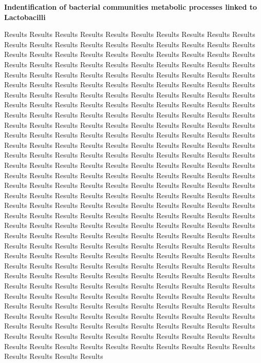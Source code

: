 \documentclass[
]{article}
\begin{document}
\clearpage

\textbf{Indentification of bacterial communities metabolic processes linked to Lactobacilli}

Results Results Results Results Results Results Results Results Results Results Results Results Results Results Results Results Results Results Results Results Results Results Results Results Results Results Results Results Results Results Results Results Results Results Results Results Results Results Results Results Results Results Results Results Results Results Results Results Results Results Results Results Results Results Results Results Results Results Results Results Results Results Results Results Results Results Results Results Results Results Results Results Results Results Results Results Results Results Results Results Results Results Results Results Results Results Results Results Results Results Results Results Results Results Results Results Results Results Results Results Results Results Results Results Results Results Results Results Results Results Results Results Results Results Results Results Results Results Results Results Results Results Results Results Results Results Results Results Results Results Results Results Results Results Results Results Results Results Results Results Results Results Results Results Results Results Results Results Results Results Results Results Results Results Results Results Results Results Results Results Results Results Results Results Results Results Results Results Results Results Results Results Results Results Results Results Results Results Results Results Results Results Results Results Results Results Results Results Results Results Results Results Results Results Results Results Results Results Results Results Results Results Results Results Results Results Results Results Results Results Results Results Results Results Results Results Results Results Results Results Results Results Results Results Results Results Results Results Results Results Results Results Results Results Results Results Results Results Results Results Results Results Results Results Results Results Results Results Results Results Results Results Results Results Results Results Results Results Results Results Results Results Results Results Results Results Results Results Results Results Results Results Results Results Results Results Results Results Results Results Results Results Results Results Results Results Results Results Results Results Results Results Results Results Results Results Results Results Results Results Results Results Results Results Results Results Results Results Results Results Results Results Results Results Results Results Results Results Results Results Results Results Results Results
\end{document}

